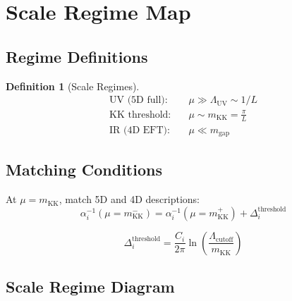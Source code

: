 \documentclass[11pt,a4paper]{article}
\newtheorem{definition}[theorem]{Definition}
\begin{document}
\section{Scale Regime Map}
\label{sec:scale-map}

\subsection{Regime Definitions}

\begin{definition}[Scale Regimes]
\begin{align}
  \text{UV (5D full):} & \quad \mu \gg \Lambda_{\text{UV}} \sim 1/L
  \label{eq:uv-regime} \\
  \text{KK threshold:} & \quad \mu \sim m_{\text{KK}} = \frac{\pi}{L}
  \label{eq:kk-regime} \\
  \text{IR (4D EFT):} & \quad \mu \ll m_{\text{gap}}
  \label{eq:ir-regime}
\end{align}
\end{definition}

\subsection{Matching Conditions}

At $\mu = m_{\text{KK}}$, match 5D and 4D descriptions:
\begin{equation}
  \alpha_i^{-1}(\mu = m_{\text{KK}}^-) = \alpha_i^{-1}(\mu = m_{\text{KK}}^+)
    + \Delta_i^{\text{threshold}}
  \label{eq:matching}
\end{equation}

\begin{equation}
  \Delta_i^{\text{threshold}} = \frac{C_i}{2\pi}
    \ln\left(\frac{\Lambda_{\text{cutoff}}}{m_{\text{KK}}}\right)
  \label{eq:threshold-correction}
\end{equation}

\subsection{Scale Regime Diagram}
\end{document}
